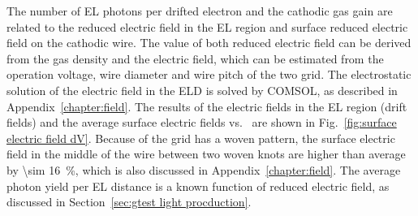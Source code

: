 The number of EL photons per drifted electron and the cathodic gas gain are related to the reduced electric field in the EL region and surface reduced electric field on the cathodic wire. The value of both reduced electric field can be derived from the gas density and the electric field, which can be estimated from the operation voltage, wire diameter and wire pitch of the two grid. The electrostatic solution of the electric field in the ELD is solved by COMSOL, as described in Appendix~\ref{chapter:field}. The results of the electric fields in the EL region (drift fields) and the average surface electric fields vs. \opdv\ are shown in Fig.~\ref{fig:surface electric field dV}.  Because of the grid has a woven pattern, the surface electric field in the middle of the wire between two woven knots are higher than average by \SI{\sim 16}{\percent}, which is also discussed in Appendix~\ref{chapter:field}. The average photon yield per EL distance is a known function of reduced electric field, as discussed in Section~\ref{sec:gtest light procduction}.%
